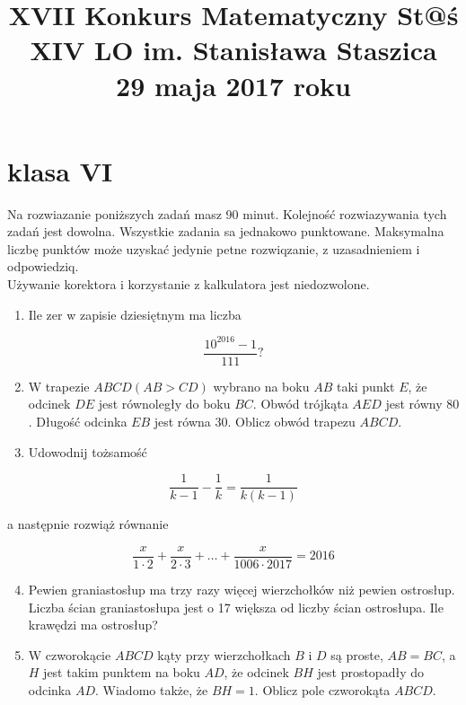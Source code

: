 \documentclass[10pt]{article}
\title{XVII Konkurs Matematyczny St@ś \\
 XIV LO im. Stanisława Staszica \\
 29 maja 2017 roku }
\author{}
\date{}
\begin{document}
\maketitle
\section*{klasa VI}
Na rozwiazanie poniższych zadań masz 90 minut. Kolejność rozwiazywania tych zadań jest dowolna. Wszystkie zadania sa jednakowo punktowane. Maksymalna liczbę punktów może uzyskać jedynie petne rozwiqzanie, z uzasadnieniem i odpowiedziq.\\
Używanie korektora i korzystanie z kalkulatora jest niedozwolone.

\begin{enumerate}
  \item Ile zer w zapisie dziesiętnym ma liczba
\end{enumerate}

\[
\frac{10^{2016}-1}{111} ?
\]

\begin{enumerate}
  \setcounter{enumi}{1}
  \item W trapezie \(A B C D(A B>C D)\) wybrano na boku \(A B\) taki punkt \(E\), że odcinek \(D E\) jest równoległy do boku \(B C\). Obwód trójkąta \(A E D\) jest równy 80 . Długość odcinka \(E B\) jest równa 30. Oblicz obwód trapezu \(A B C D\).
  \item Udowodnij tożsamość
\end{enumerate}

\[
\frac{1}{k-1}-\frac{1}{k}=\frac{1}{k(k-1)}
\]

a następnie rozwiąż równanie

\[
\frac{x}{1 \cdot 2}+\frac{x}{2 \cdot 3}+\ldots+\frac{x}{1006 \cdot 2017}=2016
\]

\begin{enumerate}
  \setcounter{enumi}{3}
  \item Pewien graniastosłup ma trzy razy więcej wierzchołków niż pewien ostrosłup. Liczba ścian graniastosłupa jest o 17 większa od liczby ścian ostrosłupa. Ile krawędzi ma ostrosłup?
  \item W czworokącie \(A B C D\) kąty przy wierzchołkach \(B\) i \(D\) są proste, \(A B=B C\), a \(H\) jest takim punktem na boku \(A D\), że odcinek \(B H\) jest prostopadły do odcinka \(A D\). Wiadomo także, że \(B H=1\). Oblicz pole czworokąta \(A B C D\).
\end{enumerate}
\end{document}
